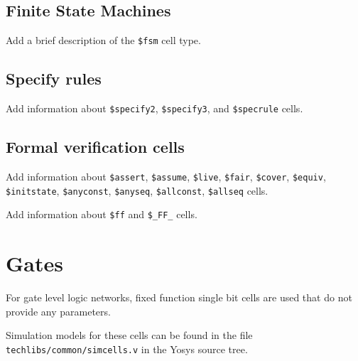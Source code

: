 \subsection{Finite State Machines}

\begin{fixme}
Add a brief description of the {\tt \$fsm} cell type.
\end{fixme}

\subsection{Specify rules}

\begin{fixme}
Add information about {\tt \$specify2}, {\tt \$specify3}, and {\tt \$specrule} cells.
\end{fixme}

\subsection{Formal verification cells}

\begin{fixme}
Add information about {\tt \$assert}, {\tt \$assume}, {\tt \$live}, {\tt \$fair}, {\tt \$cover}, {\tt \$equiv},
{\tt \$initstate}, {\tt \$anyconst}, {\tt \$anyseq}, {\tt \$allconst}, {\tt \$allseq} cells.
\end{fixme}

\begin{fixme}
Add information about {\tt \$ff} and {\tt \$\_FF\_} cells.
\end{fixme}

\section{Gates}
\label{sec:celllib_gates}

For gate level logic networks, fixed function single bit cells are used that do
not provide any parameters.

Simulation models for these cells can be found in the file {\tt techlibs/common/simcells.v} in the Yosys
source tree.

